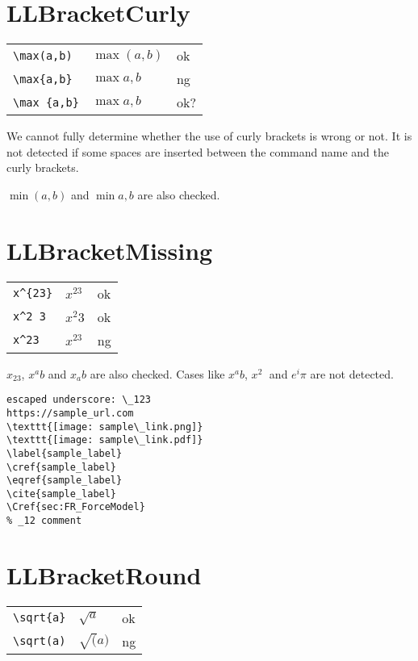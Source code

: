 \documentclass[a4paper]{article}
\newcommand{\tA}[1]{\textcolor{cA}{#1}}
\newcommand{\tC}[1]{\textcolor{cC}{#1}}
\newcommand{\tD}[1]{\textcolor{cD}{#1}}
\begin{document}
\section{LLBracketCurly}

\begin{table}[h]
	\centering
	\begin{tabular}{lll}
		\verb|\max(a,b)|  & $\max(a,b)$  & \tA{ok}  \\
		\verb|\max{a,b}|  & $\max{a,b}$  & \tD{ng}  \\
		\verb|\max {a,b}| & $\max {a,b}$ & \tC{ok?}
	\end{tabular}
\end{table}

We cannot fully determine whether the use of curly brackets is wrong or not.
It is not detected if some spaces are inserted between the command name and the curly brackets.

$\min(a,b)$ and $\min{a,b}$ are also checked.

\section{LLBracketMissing}

\begin{table}[H]
	\centering
	\begin{tabular}{lll}
		\verb|x^{23}| & $x^{23}$ & \tA{ok} \\
		\verb|x^2 3|  & $x^2 3$  & \tA{ok} \\
		\verb|x^23|   & $x^23$   & \tD{ng} \\
	\end{tabular}
\end{table}

$x_23$, $x^ab$ and $x_ab$ are also checked.
Cases like $x^a b$, $x^2\;$ and $e^i\pi$ are not detected.

\begin{verbatim}
escaped underscore: \_123
https://sample_url.com
\texttt{[image: sample\_link.png]}
\texttt{[image: sample\_link.pdf]}
\label{sample_label}
\cref{sample_label}
\eqref{sample_label}
\cite{sample_label}
\Cref{sec:FR_ForceModel}
% _12 comment
\end{verbatim}


\section{LLBracketRound}

\begin{table}[h]
	\centering
	\begin{tabular}{lll}
		\verb|\sqrt{a}| & $\sqrt{a}$ & \tA{ok} \\
		\verb|\sqrt(a)| & $\sqrt(a)$ & \tD{ng} \\
	\end{tabular}
\end{table}
\end{document}
